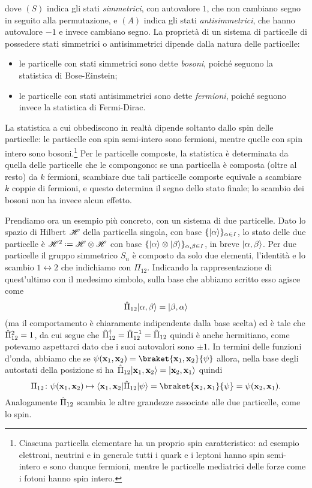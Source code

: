 dove $(S)$ indica gli stati \emph{simmetrici}, con autovalore $1$, che non cambiano segno in seguito alla permutazione, e $(A)$ indica gli stati \emph{antisimmetrici}, che hanno autovalore $-1$ e invece cambiano segno.
La proprietà di un sistema di particelle di possedere stati simmetrici o antisimmetrici dipende dalla natura delle particelle:
\begin{itemize}
    \item le particelle con stati simmetrici sono dette \emph{bosoni}, poich\'e seguono la statistica di Bose-Einstein;
    \item le particelle con stati antisimmetrici sono dette \emph{fermioni}, poich\'e seguono invece la statistica di Fermi-Dirac.
\end{itemize}
La statistica a cui obbediscono in realtà dipende soltanto dallo spin delle particelle: le particelle con spin semi-intero sono fermioni, mentre quelle con spin intero sono bosoni.\footnote{
    Ciascuna particella elementare ha un proprio spin caratteristico: ad esempio elettroni, neutrini e in generale tutti i quark e i leptoni hanno spin semi-intero e sono dunque fermioni, mentre le particelle mediatrici delle forze come i fotoni hanno spin intero.
}
Per le particelle composte, la statistica è determinata da quella delle particelle che le compongono: se una particella è composta (oltre al resto) da $k$ fermioni, scambiare due tali particelle composte equivale a scambiare $k$ coppie di fermioni, e questo determina il segno dello stato finale; lo scambio dei bosoni non ha invece alcun effetto.

Prendiamo ora un esempio più concreto, con un sistema di due particelle.
Dato lo spazio di Hilbert $\mathscr H$ della particella singola, con base $\{\lvert\alpha\rangle\}_{\alpha\in I}$, lo stato delle due particelle è $\hilbert^2\defeq\hilbert\otimes\hilbert$ con base $\{\lvert\alpha\rangle\otimes\lvert\beta\rangle\}_{\alpha,\beta\in I}$, in breve $\lvert\alpha,\beta\rangle$.
Per due particelle il gruppo simmetrico $S_n$ è composto da solo due elementi, l'identità e lo scambio $1\leftrightarrow 2$ che indichiamo con $\Pi_{12}$.
Indicando la rappresentazione di quest'ultimo con il medesimo simbolo, sulla base che abbiamo scritto esso agisce come
\begin{equation}
    \hat{\Pi}_{12}\lvert\alpha,\beta\rangle=\lvert\beta,\alpha\rangle
\end{equation}
(ma il comportamento è chiaramente indipendente dalla base scelta) ed è tale che $\hat{\Pi}_{12}^2=1$, da cui segue che $\hat{\Pi}_{12}^\dagger=\hat{\Pi}_{12}^{-1}=\hat{\Pi}_{12}$ quindi è anche hermitiano, come potevamo aspettarci dato che i suoi autovalori sono $\pm 1$.
In termini delle funzioni d'onda, abbiamo che se $\psi(\vec x_1,\vec x_2)=\braket{\vec x_1,\vec x_2}{\psi}$ allora, nella base degli autostati della posizione si ha $\hat{\Pi}_{12}\lvert\mathbf{x}_1,\mathbf{x}_2\rangle=\lvert\mathbf{x}_2,\mathbf{x}_1\rangle$ quindi
\begin{equation}
    \Pi_{12} \colon \psi(\vec x_1,\vec x_2) \mapsto \bra{\vec x_1,\vec x_2}\op\Pi_{12}\ket{\psi}=\braket{\vec x_2,\vec x_1}{\psi}=\psi(\vec x_2,\vec x_1).
    \label{eq:scambio-particelle-funzione-donda}
\end{equation}
Analogamente $\hat{\Pi}_{12}$ scambia le altre grandezze associate alle due particelle, come lo spin.

